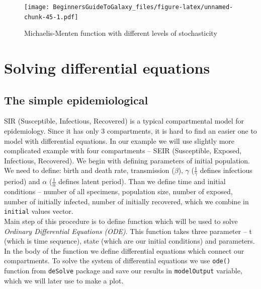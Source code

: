 \documentclass[]{book}
\theoremstyle{definition}
\theoremstyle{definition}
\theoremstyle{definition}
\theoremstyle{remark}
\begin{document}
\begin{figure}
\centering
\texttt{[image: BeginnersGuideToGalaxy\_files/figure-latex/unnamed-chunk-45-1.pdf]}
\caption{\label{fig:unnamed-chunk-45}Michaelis-Menten function with
different levels of stochasticity}
\end{figure}

\section{Solving differential
equations}\label{solving-differential-equations}

\subsection{The simple
epidemiological}\label{the-simple-epidemiological}

SIR (Susceptible, Infectious, Recovered) is a typical compartmental
model for epidemiology. Since it has only 3 compartments, it is hard to
find an easier one to model with differential equations. In our example
we will use slightly more complicated example with four compartments --
SEIR (Susceptible, Exposed, Infectious, Recovered). We begin with
defining parameters of initial population. We need to define: birth and
death rate, transmission (\(\beta\)), \(\gamma\) (\(\frac{1}{\gamma}\)
defines infectious period) and \(\alpha\) (\(\frac{1}{\alpha}\) defines
latent period). Than we define time and initial conditions -- number of
all specimens, population size, number of exposed, number of initially
infected, number of initially recovered, which we combine in
\texttt{initial} values vector.\\
Main step of this procedure is to define function which will be used to
solve \emph{Ordinary Differential Equations (ODE)}. This function takes
three parameter -- t (which is time sequence), state (which are our
initial conditions) and parameters. In the body of the function we
define differential equations which connect our compartments. To solve
the system of differential equations we use \texttt{ode()} function from
\texttt{deSolve} package and save our results in \texttt{modelOutput}
variable, which we will later use to make a plot.
\end{document}
